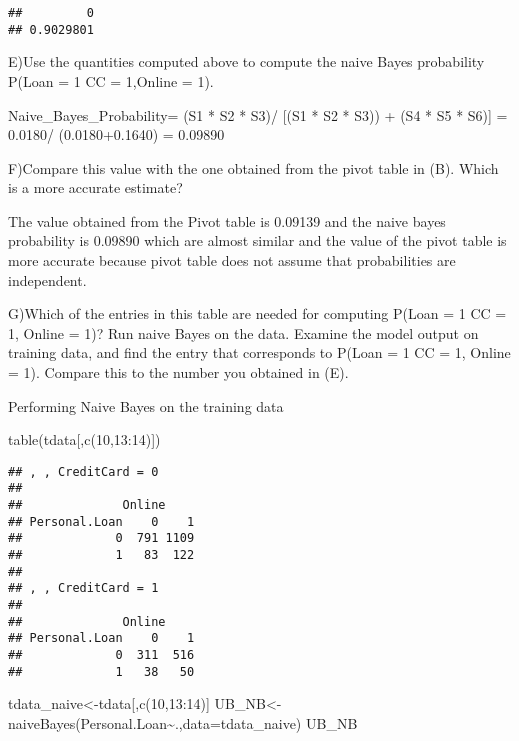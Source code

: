 \documentclass[
]{article}
\newenvironment{Shaded}{\begin{snugshade}}{\end{snugshade}}
\newcommand{\AttributeTok}[1]{\textcolor[rgb]{0.77,0.63,0.00}{#1}}
\newcommand{\DecValTok}[1]{\textcolor[rgb]{0.00,0.00,0.81}{#1}}
\newcommand{\FunctionTok}[1]{\textcolor[rgb]{0.00,0.00,0.00}{#1}}
\newcommand{\NormalTok}[1]{#1}
\newcommand{\OtherTok}[1]{\textcolor[rgb]{0.56,0.35,0.01}{#1}}
\newcommand{\SpecialCharTok}[1]{\textcolor[rgb]{0.00,0.00,0.00}{#1}}
\begin{document}
\begin{verbatim}
##         0 
## 0.9029801
\end{verbatim}

E)Use the quantities computed above to compute the naive Bayes
probability P(Loan = 1 \textbar{} CC = 1,Online = 1).

Naive\_Bayes\_Probability= (S1 * S2 * S3)/ {[}(S1 * S2 * S3)) + (S4 * S5
* S6){]} = 0.0180/ (0.0180+0.1640) = 0.09890

F)Compare this value with the one obtained from the pivot table in (B).
Which is a more accurate estimate?

The value obtained from the Pivot table is 0.09139 and the naive bayes
probability is 0.09890 which are almost similar and the value of the
pivot table is more accurate because pivot table does not assume that
probabilities are independent.

G)Which of the entries in this table are needed for computing P(Loan = 1
\textbar{} CC = 1, Online = 1)? Run naive Bayes on the data. Examine the
model output on training data, and find the entry that corresponds to
P(Loan = 1 \textbar{} CC = 1, Online = 1). Compare this to the number
you obtained in (E).

Performing Naive Bayes on the training data

\begin{Shaded}
\begin{Highlighting}[]
\FunctionTok{table}\NormalTok{(tdata[,}\FunctionTok{c}\NormalTok{(}\DecValTok{10}\NormalTok{,}\DecValTok{13}\SpecialCharTok{:}\DecValTok{14}\NormalTok{)])}
\end{Highlighting}
\end{Shaded}

\begin{verbatim}
## , , CreditCard = 0
## 
##              Online
## Personal.Loan    0    1
##             0  791 1109
##             1   83  122
## 
## , , CreditCard = 1
## 
##              Online
## Personal.Loan    0    1
##             0  311  516
##             1   38   50
\end{verbatim}

\begin{Shaded}
\begin{Highlighting}[]
\NormalTok{tdata\_naive}\OtherTok{\textless{}{-}}\NormalTok{tdata[,}\FunctionTok{c}\NormalTok{(}\DecValTok{10}\NormalTok{,}\DecValTok{13}\SpecialCharTok{:}\DecValTok{14}\NormalTok{)]}
\NormalTok{UB\_NB}\OtherTok{\textless{}{-}}\FunctionTok{naiveBayes}\NormalTok{(Personal.Loan}\SpecialCharTok{\textasciitilde{}}\NormalTok{.,}\AttributeTok{data=}\NormalTok{tdata\_naive)}
\NormalTok{UB\_NB}
\end{Highlighting}
\end{Shaded}
\end{document}
